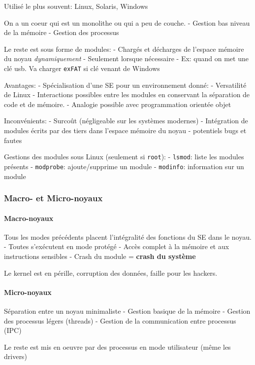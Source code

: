 Utilisé le plus souvent: Linux, Solaris, Windows

On a un coeur qui est un monolithe ou qui a peu de couche. - Gestion bas
niveau de la mémoire - Gestion des processus

Le reste est sous forme de modules: - Chargés et décharges de l'espace
mémoire du noyau \emph{dynamiquement} - Seulement lorsque nécessaire -
Ex: quand on met une clé usb. Va charger \texttt{exFAT} si clé venant de
Windows

Avantages: - Spécialisation d'une SE pour un environnement donné: -
Versatilité de Linux - Interactions possibles entre les modules en
conservant la séparation de code et de mémoire. - Analogie possible avec
programmation orientée objet

Inconvénients: - Surcoût (négligeable sur les systèmes modernes) -
Intégration de modules écrits par des tiers dans l'espace mémoire du
noyau - potentiels bugs et fautes

Gestions des modules sous Linux (seulement si \texttt{root}): -
\texttt{lsmod}: liste les modules présents - \texttt{modprobe}:
ajoute/supprime un module - \texttt{modinfo}: information sur un module

\subsubsection{Macro- et Micro-noyaux}\label{macro--et-micro-noyaux}

\paragraph{Macro-noyaux}\label{macro-noyaux}

Tous les modes précédents placent l'intégralité des fonctions du SE dans
le noyau. - Toutes s'exécutent en mode protégé - Accès complet à la
mémoire et aux instructions sensibles - Crash du module = \textbf{crash
du système}

Le kernel est en pérille, corruption des données, faille pour les
hackers.

\paragraph{Micro-noyaux}\label{micro-noyaux}

Séparation entre un noyau minimaliste - Gestion basique de la mémoire -
Gestion des processus légers (threads) - Gestion de la communication
entre processus (IPC)

Le reste est mis en oeuvre par des processus en mode utilisateur (même
les drivers)

